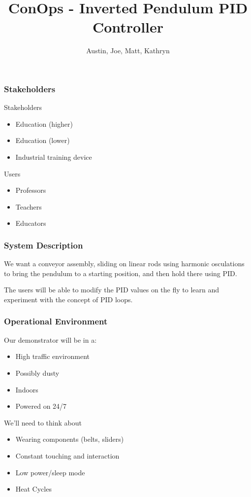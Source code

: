 \documentclass{beamer}
\title{ConOps - Inverted Pendulum PID Controller}
\author{Austin, Joe, Matt, Kathryn}
\institute{SNHU/CETA}
\begin{document}
\frame{\titlepage} %

\begin{frame}
\frametitle{Stakeholders}

\begin{block}{Stakeholders}
    \begin{itemize}
        \item Education (higher)
        \item Education (lower)
        \item Industrial training device
    \end{itemize}
\end{block}

\begin{block}{Users}
    \begin{itemize}
        \item Professors
        \item Teachers
        \item Educators
    \end{itemize}
\end{block}

\end{frame}


\begin{frame}
\frametitle{System Description}

We want a conveyor assembly, sliding on linear rods
using harmonic osculations to bring the pendulum to a starting position, and then hold there
using PID.

\begin{block}{}
    The users will be able to modify the PID values on the fly to learn and experiment
    with the concept of PID loops.
\end{block}

\end{frame}


\begin{frame}
\frametitle{Operational Environment}

Our demonstrator will be in a:
\begin{itemize}
 \item High traffic environment
 \item Possibly dusty
 \item Indoors
 \item Powered on 24/7
\end{itemize}

We'll need to think about

\begin{itemize}
 \item Wearing components (belts, sliders)
 \item Constant touching and interaction
 \item Low power/sleep mode
 \item Heat Cycles
\end{itemize}

\end{frame}
\end{document}
